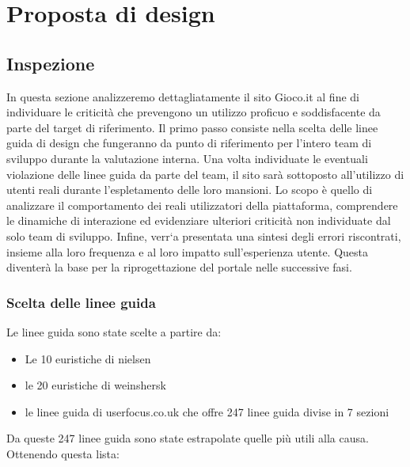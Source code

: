 \documentclass[../Report.tex]{subfiles}
\begin{document}
    \chapter{Proposta di design}
    \section{Inspezione}
    In questa sezione analizzeremo dettagliatamente il sito Gioco.it al fine di individuare le criticità che prevengono un utilizzo proficuo e soddisfacente da parte del target di riferimento. Il primo passo consiste nella scelta delle linee guida di design che fungeranno da punto di riferimento per l’intero team di sviluppo durante la valutazione interna. Una volta individuate le eventuali violazione delle linee guida da parte del team, il sito sarà sottoposto all’utilizzo di utenti reali durante l’espletamento delle loro mansioni. Lo scopo è quello di analizzare il comportamento dei reali utilizzatori della piattaforma, comprendere le dinamiche di interazione ed evidenziare ulteriori criticità non individuate dal solo team di sviluppo. Infine, verr`a presentata una sintesi degli errori riscontrati, insieme alla loro frequenza e al loro impatto sull’esperienza utente. Questa diventerà la base per la riprogettazione del portale nelle successive fasi. 

    \subsection{Scelta delle linee guida}
    Le linee guida sono state scelte a partire da:
    \begin{itemize}
        \item Le 10 euristiche di nielsen 
        \item le 20 euristiche di weinshersk
        \item le linee guida di userfocus.co.uk che offre 247 linee guida divise in 7 sezioni
    \end{itemize}

    Da queste 247 linee guida sono state estrapolate quelle più utili alla causa. Ottenendo questa lista:
\end{document}

